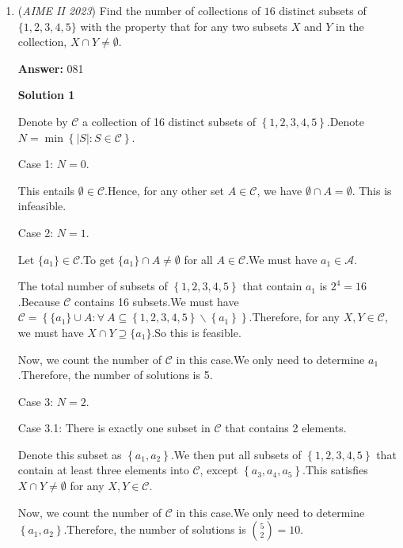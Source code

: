 \begin{enumerate}
 \textbf{mathboy282}

 LaTeX Edit: ~Bigbrain\_2009

 


	\item (\textit{AIME II 2023}) Find the number of collections of $16$ distinct subsets of $\{1,2,3,4,5\}$ with the property that for any two subsets $X$ and $Y$ in the collection, $X \cap Y \not= \emptyset.$

 \textbf{Answer: }081



\textbf{Solution 1}

Denote by $\mathcal C$ a collection of 16 distinct subsets of $\left\{ 1, 2, 3, 4, 5 \right\}$.Denote $N = \min \left\{ |S|: S \in \mathcal C \right\}$.

 Case 1: $N = 0$.

 This entails $\emptyset \in \mathcal C$.Hence, for any other set $A \in \mathcal C$, we have $\emptyset \cap A = \emptyset$. This is infeasible.

 Case 2: $N = 1$.

 Let $\{a_1\} \in \mathcal C$.To get $\{a_1\} \cap A \neq \emptyset$ for all $A \in \mathcal C$.We must have $a_1 \in \mathcal A$.

 The total number of subsets of $\left\{ 1, 2, 3, 4, 5 \right\}$ that contain $a_1$ is $2^4 = 16$.Because $\mathcal C$ contains 16 subsets.We must have $\mathcal C = \left\{ \{a_1\} \cup A : \forall \ A \subseteq \left\{ 1, 2, 3, 4, 5 \right\} \backslash \left\{a_1 \right\} \right\}$.Therefore, for any $X, Y \in \mathcal C$, we must have $X \cap Y \supseteq \{a_1\}$.So this is feasible.

 Now, we count the number of $\mathcal C$ in this case.We only need to determine $a_1$.Therefore, the number of solutions is 5.

 Case 3: $N = 2$.

 Case 3.1: There is exactly one subset in $\mathcal C$ that contains 2 elements.

 Denote this subset as $\left\{ a_1, a_2 \right\}$.We then put all subsets of $\left\{ 1, 2, 3, 4, 5 \right\}$ that contain at least three elements into $\mathcal C$, except $\left\{ a_3, a_4, a_5 \right\}$.This satisfies $X \cap Y \neq \emptyset$ for any $X, Y \in \mathcal C$.

 Now, we count the number of $\mathcal C$ in this case.We only need to determine $\left\{ a_1, a_2 \right\}$.Therefore, the number of solutions is $\binom{5}{2} = 10$.


\end{enumerate}
